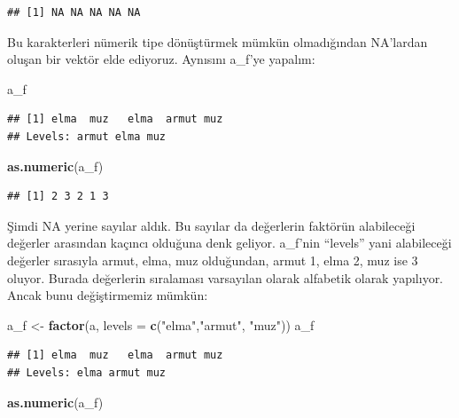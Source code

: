 \documentclass[
]{book}
\newenvironment{Shaded}{\begin{snugshade}}{\end{snugshade}}
\newcommand{\DataTypeTok}[1]{\textcolor[rgb]{0.13,0.29,0.53}{#1}}
\newcommand{\KeywordTok}[1]{\textcolor[rgb]{0.13,0.29,0.53}{\textbf{#1}}}
\newcommand{\NormalTok}[1]{#1}
\newcommand{\StringTok}[1]{\textcolor[rgb]{0.31,0.60,0.02}{#1}}
\begin{document}
\begin{verbatim}
## [1] NA NA NA NA NA
\end{verbatim}

Bu karakterleri nümerik tipe dönüştürmek mümkün olmadığından NA'lardan oluşan bir vektör elde ediyoruz. Aynısını a\_f'ye yapalım:

\begin{Shaded}
\begin{Highlighting}[]
\NormalTok{a\_f}
\end{Highlighting}
\end{Shaded}

\begin{verbatim}
## [1] elma  muz   elma  armut muz  
## Levels: armut elma muz
\end{verbatim}

\begin{Shaded}
\begin{Highlighting}[]
\KeywordTok{as.numeric}\NormalTok{(a\_f)}
\end{Highlighting}
\end{Shaded}

\begin{verbatim}
## [1] 2 3 2 1 3
\end{verbatim}

Şimdi NA yerine sayılar aldık. Bu sayılar da değerlerin faktörün alabileceği değerler arasından kaçıncı olduğuna denk geliyor. a\_f'nin ``levels'' yani alabileceği değerler sırasıyla armut, elma, muz olduğundan, armut 1, elma 2, muz ise 3 oluyor. Burada değerlerin sıralaması varsayılan olarak alfabetik olarak yapılıyor. Ancak bunu değiştirmemiz mümkün:

\begin{Shaded}
\begin{Highlighting}[]
\NormalTok{a\_f <{-}}\StringTok{ }\KeywordTok{factor}\NormalTok{(a, }\DataTypeTok{levels =} \KeywordTok{c}\NormalTok{(}\StringTok{"elma"}\NormalTok{,}\StringTok{"armut"}\NormalTok{, }\StringTok{"muz"}\NormalTok{))}
\NormalTok{a\_f}
\end{Highlighting}
\end{Shaded}

\begin{verbatim}
## [1] elma  muz   elma  armut muz  
## Levels: elma armut muz
\end{verbatim}

\begin{Shaded}
\begin{Highlighting}[]
\KeywordTok{as.numeric}\NormalTok{(a\_f)}
\end{Highlighting}
\end{Shaded}
\end{document}
